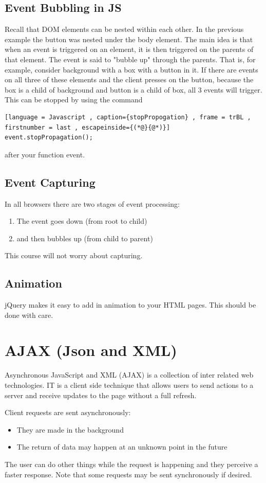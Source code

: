 \documentclass[a4paper]{article}
\theoremstyle{plain}
\theoremstyle{definition}
\newtheorem{defn}{Definition}[section]
\theoremstyle{remark}
\begin{document}
\begin{flushleft}
\subsection{Event Bubbling in JS}
Recall that DOM elements can be nested within each other. In the previous example the button was nested under the body element. The main idea is that when an event is triggered on an element, it is then triggered on the parents of that element. The event is said to "bubble up" through the parents. That is, for example, consider background with a box with a button in it. If there are events on all three of these elements and the client presses on the button, because the box is a child of background and button is a child of box, all 3 events will trigger. This can be stopped by using the command
\begin{lstlisting}[language = Javascript , caption={stopPropogation} , frame = trBL , firstnumber = last , escapeinside={(*@}{@*)}]
event.stopPropagation();
\end{lstlisting}
after your function event.
\subsection{Event Capturing}
In all browsers there are two stages of event processing:
\begin{enumerate}
	\item The event goes down (from root to child)
	\item and then bubbles up (from child to parent)
\end{enumerate}
This course will not worry about capturing.
\subsection{Animation}
jQuery makes it easy to add in animation to your HTML pages. This should be done with care. 
\section{AJAX (Json and XML)}
\begin{tcolorbox}[colback=black!3!white,colframe=black!60!white,title=\begin{defn}AJAX \label{AJAX}\end{defn}]
Asynchronous JavaScript and XML (AJAX) is a collection of inter related web technologies. IT is a client side technique that allows users to send actions to a server and receive updates to the page without a full refresh.
\end{tcolorbox}
Client requests are sent asynchronously:
\begin{itemize}
	\item They are made in the background
	\item The return of data may happen at an unknown point in the future
\end{itemize}
The user can do other things while the request is happening and they perceive a faster response. Note that some requests may be sent synchronously if desired.

\end{flushleft}
\end{document}
